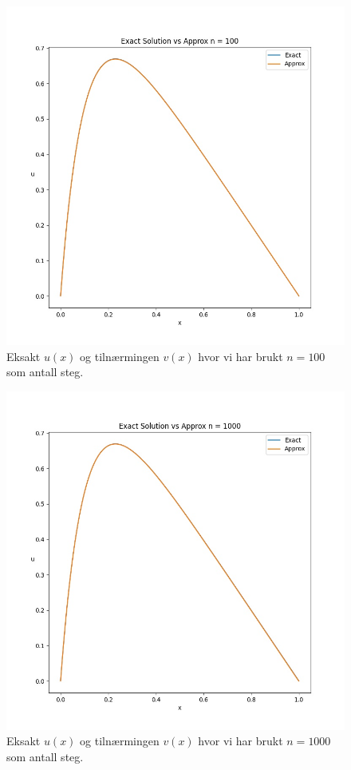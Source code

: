 \documentclass[english,notitlepage]{revtex4-1}  %
\begin{document}
\begin{figure}
\centering
\includegraphics[scale=0.65]{Images/problem7NEW100.jpg}
\caption{Eksakt $u(x)$ og tilnærmingen $v(x)$ hvor vi har brukt $n = 100$ som antall steg.}
\label{7n100}
\end{figure}

\begin{figure}
\centering
\includegraphics[scale=0.65]{Images/problem7NEW1000.jpg}
\caption{Eksakt $u(x)$ og tilnærmingen $v(x)$ hvor vi har brukt $n = 1000$ som antall steg.}
\label{7n1000}
\end{figure}
\end{document}
